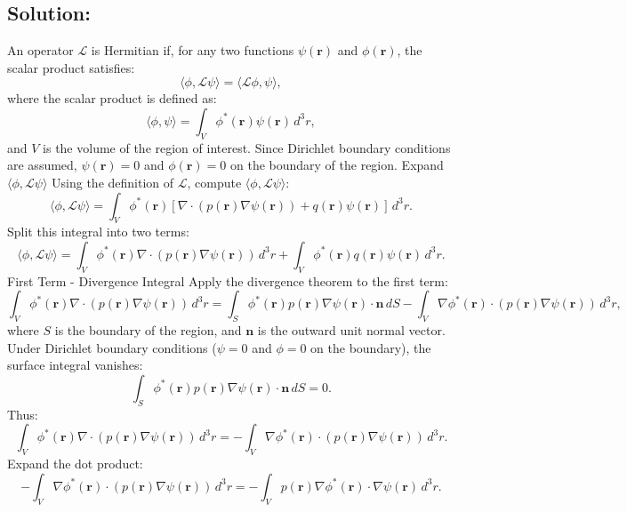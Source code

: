 \documentclass[12pt]{article}
\begin{document}
   \subsection*{Solution:}
        An operator \(\mathcal{L}\) is Hermitian if, for any two functions \(\psi(\mathbf{r})\) and \(\phi(\mathbf{r})\), the scalar product satisfies:
        \[
        \langle \phi, \mathcal{L}\psi \rangle = \langle \mathcal{L}\phi, \psi \rangle,
        \]
        where the scalar product is defined as:
        \[
        \langle \phi, \psi \rangle = \int_V \phi^*(\mathbf{r}) \psi(\mathbf{r}) \, d^3r,
        \]
        and \(V\) is the volume of the region of interest.
        Since Dirichlet boundary conditions are assumed, \(\psi(\mathbf{r}) = 0\) and \(\phi(\mathbf{r}) = 0\) on the boundary of the region.
        Expand \(\langle \phi, \mathcal{L}\psi \rangle\)
        Using the definition of \(\mathcal{L}\), compute \(\langle \phi, \mathcal{L}\psi \rangle\):
        \[
        \langle \phi, \mathcal{L}\psi \rangle = \int_V \phi^*(\mathbf{r}) \left[ \nabla \cdot \left( p(\mathbf{r}) \nabla \psi(\mathbf{r}) \right) + q(\mathbf{r}) \psi(\mathbf{r}) \right] \, d^3r.
        \]
        Split this integral into two terms:
        \[
        \langle \phi, \mathcal{L}\psi \rangle = \int_V \phi^*(\mathbf{r}) \nabla \cdot \left( p(\mathbf{r}) \nabla \psi(\mathbf{r}) \right) \, d^3r + \int_V \phi^*(\mathbf{r}) q(\mathbf{r}) \psi(\mathbf{r}) \, d^3r.
        \]
        First Term - Divergence Integral
        Apply the divergence theorem to the first term:
        \[
        \int_V \phi^*(\mathbf{r}) \nabla \cdot \left( p(\mathbf{r}) \nabla \psi(\mathbf{r}) \right) \, d^3r = \int_S \phi^*(\mathbf{r}) p(\mathbf{r}) \nabla \psi(\mathbf{r}) \cdot \mathbf{n} \, dS - \int_V \nabla \phi^*(\mathbf{r}) \cdot \left( p(\mathbf{r}) \nabla \psi(\mathbf{r}) \right) \, d^3r,
        \]
        where \(S\) is the boundary of the region, and \(\mathbf{n}\) is the outward unit normal vector.
        Under Dirichlet boundary conditions (\(\psi = 0\) and \(\phi = 0\) on the boundary), the surface integral vanishes:
        \[
        \int_S \phi^*(\mathbf{r}) p(\mathbf{r}) \nabla \psi(\mathbf{r}) \cdot \mathbf{n} \, dS = 0.
        \]
        Thus:
        \[
        \int_V \phi^*(\mathbf{r}) \nabla \cdot \left( p(\mathbf{r}) \nabla \psi(\mathbf{r}) \right) \, d^3r = -\int_V \nabla \phi^*(\mathbf{r}) \cdot \left( p(\mathbf{r}) \nabla \psi(\mathbf{r}) \right) \, d^3r.
        \]
        Expand the dot product:
        \[
        -\int_V \nabla \phi^*(\mathbf{r}) \cdot \left( p(\mathbf{r}) \nabla \psi(\mathbf{r}) \right) \, d^3r = -\int_V p(\mathbf{r}) \nabla \phi^*(\mathbf{r}) \cdot \nabla \psi(\mathbf{r}) \, d^3r.
        \]
\end{document}
